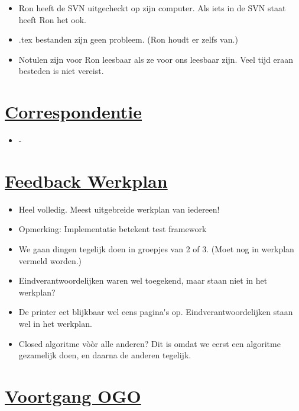 \documentclass[a4paper]{article}
\begin{document}
\begin{itemize}
\item Ron heeft de SVN uitgecheckt op zijn computer. Als iets in de SVN staat heeft Ron het ook.
\item .tex bestanden zijn geen probleem. (Ron houdt er zelfs van.)
\item Notulen zijn voor Ron leesbaar als ze voor ons leesbaar zijn. Veel tijd eraan besteden is niet vereist.
\end{itemize}


\section{\underline{Correspondentie}} %
\label{sec:post_in_uit}

\begin{itemize}
\item -
\end{itemize}


\section{\underline{Feedback Werkplan}} %
\label{sec:feedback_werkplan}

\begin{itemize}
\item Heel volledig. Meest uitgebreide werkplan van iedereen!
\item Opmerking: Implementatie betekent test framework
\item We gaan dingen tegelijk doen in groepjes van 2 of 3. (Moet nog in werkplan vermeld worden.)
\item Eindverantwoordelijken waren wel toegekend, maar staan niet in het werkplan?
\item De printer eet blijkbaar wel eens pagina\'{}s op. Eindverantwoordelijken staan wel in het werkplan.
\item Closed algoritme v\`{o}\`{o}r alle anderen? Dit is omdat we eerst een algoritme gezamelijk doen, en daarna de anderen tegelijk.
\end{itemize}


\section{\underline{Voortgang OGO}} %
\label{sec:voortgang_ogo}
    
\end{document}
